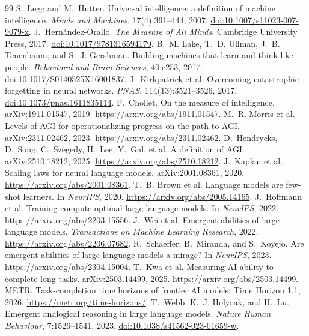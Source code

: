 \documentclass[11pt]{article}
\begin{document}
\begin{thebibliography}{99}
 S.~Legg and M.~Hutter. Universal intelligence: a definition of machine intelligence. \emph{Minds and Machines}, 17(4):391--444, 2007. \href{https://doi.org/10.1007/s11023-007-9079-x}{doi:10.1007/s11023-007-9079-x}.
 J.~Hern\'andez-Orallo. \emph{The Measure of All Minds}. Cambridge University Press, 2017. \href{https://doi.org/10.1017/9781316594179}{doi:10.1017/9781316594179}.
 B.~M. Lake, T.~D. Ullman, J.~B. Tenenbaum, and S.~J. Gershman. Building machines that learn and think like people. \emph{Behavioral and Brain Sciences}, 40:e253, 2017. \href{https://doi.org/10.1017/S0140525X16001837}{doi:10.1017/S0140525X16001837}.
 J.~Kirkpatrick et al. Overcoming catastrophic forgetting in neural networks. \emph{PNAS}, 114(13):3521--3526, 2017. \href{https://doi.org/10.1073/pnas.1611835114}{doi:10.1073/pnas.1611835114}.
 F.~Chollet. On the measure of intelligence. arXiv:1911.01547, 2019. \url{https://arxiv.org/abs/1911.01547}.
 M.~R. Morris et al. Levels of AGI for operationalizing progress on the path to AGI. arXiv:2311.02462, 2023. \url{https://arxiv.org/abs/2311.02462}.
 D.~Hendrycks, D.~Song, C.~Szegedy, H.~Lee, Y.~Gal, et al. A definition of AGI. arXiv:2510.18212, 2025. \url{https://arxiv.org/abs/2510.18212}.
 J.~Kaplan et al. Scaling laws for neural language models. arXiv:2001.08361, 2020. \url{https://arxiv.org/abs/2001.08361}.
 T.~B. Brown et al. Language models are few-shot learners. In \emph{NeurIPS}, 2020. \url{https://arxiv.org/abs/2005.14165}.
 J.~Hoffmann et al. Training compute-optimal large language models. In \emph{NeurIPS}, 2022. \url{https://arxiv.org/abs/2203.15556}.
 J.~Wei et al. Emergent abilities of large language models. \emph{Transactions on Machine Learning Research}, 2022. \url{https://arxiv.org/abs/2206.07682}.
 R.~Schaeffer, B.~Miranda, and S.~Koyejo. Are emergent abilities of large language models a mirage? In \emph{NeurIPS}, 2023. \url{https://arxiv.org/abs/2304.15004}.
 T.~Kwa et al. Measuring AI ability to complete long tasks. arXiv:2503.14499, 2025. \url{https://arxiv.org/abs/2503.14499}.
 METR. Task-completion time horizons of frontier AI models; Time Horizon 1.1, 2026. \url{https://metr.org/time-horizons/}.
 T.~Webb, K.~J. Holyoak, and H.~Lu. Emergent analogical reasoning in large language models. \emph{Nature Human Behaviour}, 7:1526--1541, 2023. \href{https://doi.org/10.1038/s41562-023-01659-w}{doi:10.1038/s41562-023-01659-w}.

\end{thebibliography}
\end{document}
